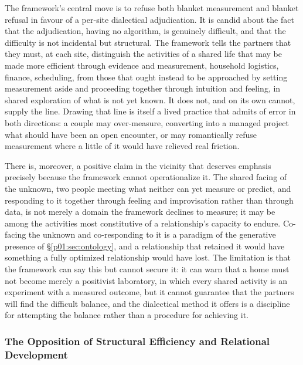 The framework's central move is to refuse both blanket measurement and blanket refusal in favour of a per-site dialectical adjudication. It is candid about the fact that the adjudication, having no algorithm, is genuinely difficult, and that the difficulty is not incidental but structural. The framework tells the partners that they must, at each site, distinguish the activities of a shared life that may be made more efficient through evidence and measurement, household logistics, finance, scheduling, from those that ought instead to be approached by setting measurement aside and proceeding together through intuition and feeling, in shared exploration of what is not yet known. It does not, and on its own cannot, supply the line. Drawing that line is itself a lived practice that admits of error in both directions: a couple may over-measure, converting into a managed project what should have been an open encounter, or may romantically refuse measurement where a little of it would have relieved real friction.

There is, moreover, a positive claim in the vicinity that deserves emphasis precisely because the framework cannot operationalize it. The shared facing of the unknown, two people meeting what neither can yet measure or predict, and responding to it together through feeling and improvisation rather than through data, is not merely a domain the framework declines to measure; it may be among the activities most constitutive of a relationship's capacity to endure. Co-facing the unknown and co-responding to it is a paradigm of the generative presence of §\ref{p01:sec:ontology}, and a relationship that retained it would have something a fully optimized relationship would have lost. The limitation is that the framework can say this but cannot secure it: it can warn that a home must not become merely a positivist laboratory, in which every shared activity is an experiment with a measured outcome, but it cannot guarantee that the partners will find the difficult balance, and the dialectical method it offers is a discipline for attempting the balance rather than a procedure for achieving it.

\subsubsection{The Opposition of Structural Efficiency and Relational Development}

